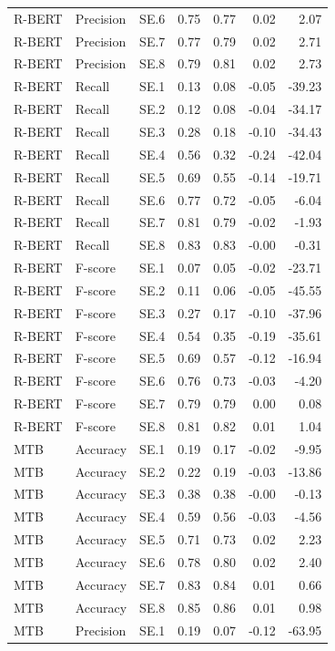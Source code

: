 \begin{tabular}{lllrrrr}
R-BERT & Precision & SE.6 & 0.75 & 0.77 & 0.02 & 2.07 \\
R-BERT & Precision & SE.7 & 0.77 & 0.79 & 0.02 & 2.71 \\
R-BERT & Precision & SE.8 & 0.79 & 0.81 & 0.02 & 2.73 \\
R-BERT & Recall & SE.1 & 0.13 & 0.08 & -0.05 & -39.23 \\
R-BERT & Recall & SE.2 & 0.12 & 0.08 & -0.04 & -34.17 \\
R-BERT & Recall & SE.3 & 0.28 & 0.18 & -0.10 & -34.43 \\
R-BERT & Recall & SE.4 & 0.56 & 0.32 & -0.24 & -42.04 \\
R-BERT & Recall & SE.5 & 0.69 & 0.55 & -0.14 & -19.71 \\
R-BERT & Recall & SE.6 & 0.77 & 0.72 & -0.05 & -6.04 \\
R-BERT & Recall & SE.7 & 0.81 & 0.79 & -0.02 & -1.93 \\
R-BERT & Recall & SE.8 & 0.83 & 0.83 & -0.00 & -0.31 \\
R-BERT & F-score & SE.1 & 0.07 & 0.05 & -0.02 & -23.71 \\
R-BERT & F-score & SE.2 & 0.11 & 0.06 & -0.05 & -45.55 \\
R-BERT & F-score & SE.3 & 0.27 & 0.17 & -0.10 & -37.96 \\
R-BERT & F-score & SE.4 & 0.54 & 0.35 & -0.19 & -35.61 \\
R-BERT & F-score & SE.5 & 0.69 & 0.57 & -0.12 & -16.94 \\
R-BERT & F-score & SE.6 & 0.76 & 0.73 & -0.03 & -4.20 \\
R-BERT & F-score & SE.7 & 0.79 & 0.79 & 0.00 & 0.08 \\
R-BERT & F-score & SE.8 & 0.81 & 0.82 & 0.01 & 1.04 \\
MTB & Accuracy & SE.1 & 0.19 & 0.17 & -0.02 & -9.95 \\
MTB & Accuracy & SE.2 & 0.22 & 0.19 & -0.03 & -13.86 \\
MTB & Accuracy & SE.3 & 0.38 & 0.38 & -0.00 & -0.13 \\
MTB & Accuracy & SE.4 & 0.59 & 0.56 & -0.03 & -4.56 \\
MTB & Accuracy & SE.5 & 0.71 & 0.73 & 0.02 & 2.23 \\
MTB & Accuracy & SE.6 & 0.78 & 0.80 & 0.02 & 2.40 \\
MTB & Accuracy & SE.7 & 0.83 & 0.84 & 0.01 & 0.66 \\
MTB & Accuracy & SE.8 & 0.85 & 0.86 & 0.01 & 0.98 \\
MTB & Precision & SE.1 & 0.19 & 0.07 & -0.12 & -63.95 \\

\end{tabular}
